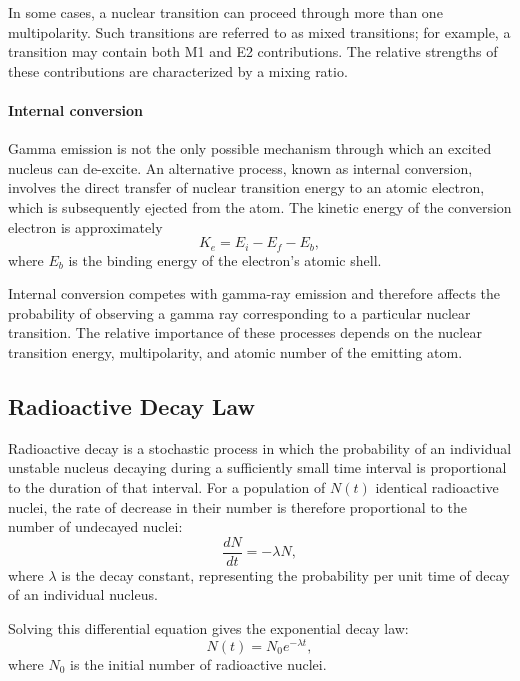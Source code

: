 In some cases, a nuclear transition can proceed through more than one multipolarity. Such transitions are referred to as mixed transitions; for example, a transition may contain both M1 and E2 contributions. The relative strengths of these contributions are characterized by a mixing ratio.

\paragraph{Internal conversion}

Gamma emission is not the only possible mechanism through which an excited nucleus can de-excite. An alternative process, known as internal conversion, involves the direct transfer of nuclear transition energy to an atomic electron, which is subsequently ejected from the atom. The kinetic energy of the conversion electron is approximately
\begin{equation}
    K_e = E_i-E_f-E_b,
\end{equation}
where $E_b$ is the binding energy of the electron's atomic shell.

Internal conversion competes with gamma-ray emission and therefore affects the probability of observing a gamma ray corresponding to a particular nuclear transition. The relative importance of these processes depends on the nuclear transition energy, multipolarity, and atomic number of the emitting atom.

\subsection{Radioactive Decay Law}

Radioactive decay is a stochastic process in which the probability of an individual unstable nucleus decaying during a sufficiently small time interval is proportional to the duration of that interval. For a population of $N(t)$ identical radioactive nuclei, the rate of decrease in their number is therefore proportional to the number of undecayed nuclei:
\begin{equation}
    \frac{dN}{dt}=-\lambda N,
\end{equation}
where $\lambda$ is the decay constant, representing the probability per unit time of decay of an individual nucleus.

Solving this differential equation gives the exponential decay law:
\begin{equation}
    N(t)=N_0e^{-\lambda t},
\end{equation}
where $N_0$ is the initial number of radioactive nuclei.

